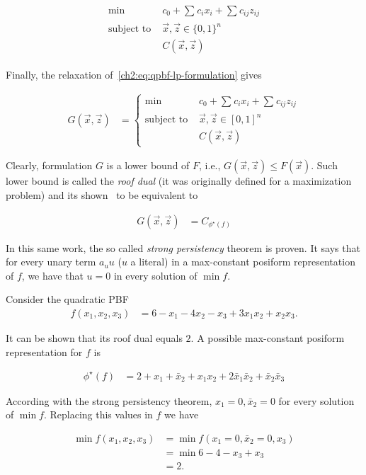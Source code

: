 \begin{align}
	\begin{array}{rl}
		\min& c_0 + \sum_{}{c_ix_i} + \sum_{}{c_{ij}z_{ij}} \\
		\text{subject to }&  \vec{x},\vec{z} \in \{0,1\}^n\\
		&C(\vec{x},\vec{z})	
	\end{array}
	\label{ch2:eq:qpbf-lp-formulation}
\end{align}

Finally, the relaxation of~\cref{ch2:eq:qpbf-lp-formulation} gives

\begin{align*}
	G(\vec{x},\vec{z}) &= \left\{ \begin{array}{rl}
		\min& c_0 + \sum_{}{c_ix_i} + \sum_{}{c_{ij}z_{ij}} \\
		\text{subject to }&  \vec{x},\vec{z} \in [0,1]^n\\
		&C(\vec{x},\vec{z})
	\end{array}\right.
\end{align*}

Clearly, formulation $G$ is a lower bound of $F$, i.e.,  $G(\vec{x},\vec{z}) \leq F(\vec{x})$. Such lower bound is called the \emph{roof dual} (it was originally defined for a maximization problem) and its shown~\cite{hammer84} to be equivalent to

\begin{align*}
	G(\vec{x},\vec{z}) &= C_{\phi^{\star}(f)}
\end{align*}

In this same work, the so called \emph{strong persistency} theorem is proven. It says that for every unary term $a_uu$ ($u$ a literal) in a max-constant posiform representation of $f$, we have that $u=0$ in every solution of $\min f$.

\begin{example}
Consider the quadratic PBF 
\begin{align*}
	f(x_1,x_2,x_3) &= 6-x_1-4x_2-x_3+3x_1x_2+x_2x_3.
\end{align*}

It can be shown that its roof dual equals $2$. A possible max-constant posiform representation for $f$ is

\begin{align*}
	\phi^{\star}(f) &= 2 + x_1 + \bar{x}_2 + x_1x_2 +2\bar{x}_1\bar{x}_2 + \bar{x}_2\bar{x}_3
\end{align*}

According with the strong persistency theorem, $x_1=0,\bar{x}_2=0$ for every solution of $\min f$. Replacing this values in $f$ we have

\begin{align*}
	\min f(x_1,x_2,x_3) &=\min f(x_1=0,\bar{x}_2=0,x_3) \\
	&= \min 6 - 4 - x_3 + x_3 \\
	&= 2.
\end{align*}
\end{example}

